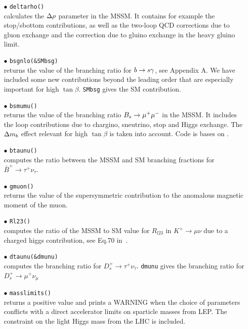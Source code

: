 \documentclass[12pt,a4paper]{article}
\begin{document}
\noi$\bullet$ \verb|deltarho()|\\
 calculates  the $\Delta\rho$ parameter in the MSSM.  It contains for example the 
stop/sbottom contributions, as well as the two-loop QCD
corrections due to gluon exchange and the correction due to gluino
exchange in the heavy gluino limit.

\noi$\bullet$ \verb|bsgnlo(&SMbsg)|\\ returns the value of the branching ratio for  $b\rightarrow s\gamma$, see Appendix A. 
We have included some new contributions beyond the leading order that are
especially important for high $\tan\beta$. \verb|SMbsg| gives the SM contribution.

\noi$\bullet$ \verb|bsmumu()|\\ returns the value of the branching ratio $B_s\to \mu^+\mu^-$ in the
MSSM. It includes the loop contributions
due to chargino, sneutrino, stop and Higgs exchange. The $\Delta m_b$ 
effect relevant for high $\tan \beta$ is taken into account. Code is bases on \cite{Bobeth:2001sq}.

\noi$\bullet$ \verb|btaunu()|\\
computes the ratio between the MSSM and SM branching fractions for $\bar{B}^+\rightarrow\tau^+\nu_\tau$. 


\noi$\bullet$ \verb|gmuon()|\\
returns the value of the supersymmetric contribution to the
anomalous magnetic moment of the muon.

\noi$\bullet$ \verb|Rl23()|\\
computes the ratio of the MSSM to SM value for $R_{l23}$ in $K^+\rightarrow \mu\nu$  due to a  charged higgs contribution, see Eq.70 in~\cite{Belanger:2013oya}. 

\noi$\bullet$ \verb|dtaunu(&dmunu)|\\
computes the branching ratio  for ${D}_s^+\rightarrow\tau^+\nu_\tau$. \verb|dmunu| 
gives  the branching ratio  for ${D}_s^+\rightarrow\mu^+\nu_\mu$

 
\noi$\bullet$ \verb|masslimits()|\\
returns a positive value  and
 prints a WARNING when the choice of parameters conflicts with a
direct accelerator limits on sparticle masses from LEP.
The constraint on the light Higgs mass from the LHC is included.  
\end{document}

